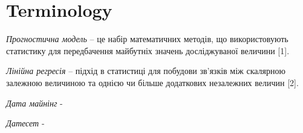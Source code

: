 \section{Terminology}
\textit{Прогностична модель} – це набір математичних методів, що використовують статистику для передбачення майбутніх значень досліджуваної величини [1]. 

\textit{Лінійна регресія} – підхід в статистиці для побудови зв’язків між скалярною залежною величиною та однією чи більше додаткових незалежних величин [2].

\textit{Дата майнінг} -

\textit{Датесет} - 

